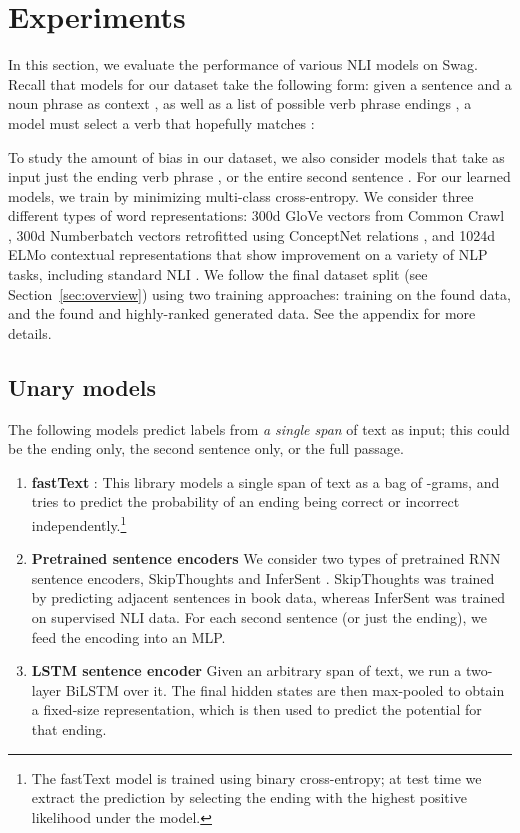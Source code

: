 \documentclass[11pt,a4paper]{article}
\newcommand\customfont[1]{{\usefont{T1}{perm}{m}{n}#1}}
\newcommand{\datasetname}{{\small\customfont{Swag}}}
\begin{document}
\section{Experiments}
In this section, we evaluate the performance of various NLI models on \datasetname. Recall that models for our dataset take the following form: given a sentence and a noun phrase as context , as well as a list of possible verb phrase endings , a model  must select a verb  that hopefully matches :
{\setlength{\abovedisplayskip}{5pt}
\setlength{\belowdisplayskip}{5pt}
\setlength{\abovedisplayshortskip}{0pt}
\setlength{\belowdisplayshortskip}{0pt}
    
}
To study the amount of bias in our dataset, we also consider models that take as input just the ending verb phrase , or the entire second sentence . For our learned models, we train  by minimizing multi-class cross-entropy. We consider three different types of word representations: 300d GloVe vectors from Common Crawl \cite{pennington2014glove}, 300d Numberbatch vectors retrofitted using ConceptNet relations \cite{speer2017conceptnet}, and 1024d ELMo contextual representations that show improvement on a variety of NLP tasks, including standard NLI \cite{peters2018deep}. We follow the final dataset split (see Section~\ref{sec:overview}) using two training approaches: training on the found data, and the found and highly-ranked generated data. See the appendix for more details.

\subsection{Unary models}
The following models predict labels from \emph{a single span} of text as input; this could be the ending only, the second sentence only, or the full passage.

\begin{enumerate}[wide, labelwidth=!,labelindent=0pt,noitemsep,topsep=0pt,label=\textbf{\alph*}.]
\item {\bf fastText} \cite{joulin2017bag}: This library models a single span of text as a bag of -grams, and tries to predict the probability of an ending being correct or incorrect independently.\footnote{The fastText model is trained using binary cross-entropy; at test time we extract the prediction by selecting the ending with the highest positive likelihood under the model.}
\item {\bf Pretrained sentence encoders}  We consider two types of pretrained RNN sentence encoders,  SkipThoughts \cite{kiros2015skip} and InferSent \cite{conneau2017supervised}. SkipThoughts was trained by predicting adjacent sentences in book data, whereas InferSent was trained on supervised NLI data. For each second sentence (or just the ending), we feed the encoding into an MLP.
\item {\bf LSTM sentence encoder} Given an arbitrary span of text, we run a two-layer BiLSTM over it. The final hidden states are then max-pooled to obtain a fixed-size representation, which is then used to predict the potential for that ending.
\end{enumerate}
\end{document}
